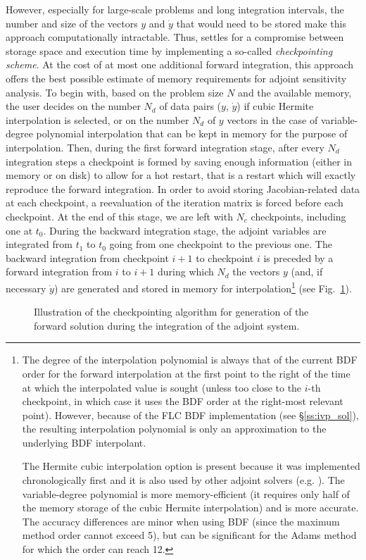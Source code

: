 However, especially for large-scale problems and long integration
intervals, the number and size of the vectors $y$ and ${\dot y}$ that would 
need to be stored make this approach computationally intractable. 
Thus, {\cvodes} settles for a compromise between storage space and execution time by
implementing a so-called {\em checkpointing scheme}. At the cost of at most one
additional forward integration, this approach offers the best possible estimate
of memory requirements for adjoint sensitivity analysis. To begin with, based on
the problem size $N$ and the available memory, the user decides on the number
$N_d$ of data pairs ($y$, ${\dot y}$) if cubic Hermite interpolation is selected, 
or on the number $N_d$ of $y$ vectors in the case of variable-degree polynomial
interpolation that can be kept in memory for the purpose of interpolation. 
Then, during the first forward integration stage, after
every $N_d$ integration steps a checkpoint is formed by saving enough information
(either in memory or on disk) to allow for a hot restart, that is a restart
which will exactly reproduce the forward integration. In order to avoid storing
Jacobian-related data at each checkpoint, a reevaluation of the iteration matrix
is forced before each checkpoint. At the end of this stage, we are left with $N_c$ 
checkpoints, including one at $t_0$.
During the backward integration stage, the adjoint variables are integrated
from $t_1$ to $t_0$ going from one checkpoint to the previous one.
The backward integration from checkpoint $i+1$ to checkpoint $i$ is preceded
by a forward integration from $i$ to $i+1$ during which $N_d$ the vectors 
$y$ (and, if necessary ${\dot y}$) are generated and stored in memory for 
interpolation\footnote{The degree of the 
interpolation polynomial is always that of the current BDF order for the forward
interpolation at the first point to the right of the time at which the interpolated
value is sought (unless too close to the $i$-th checkpoint, in which case it uses
the BDF order at the right-most relevant point). However, because of the FLC BDF
implementation (see \S\ref{ss:ivp_sol}), the resulting interpolation polynomial
is only an approximation to the underlying BDF interpolant.

The Hermite cubic interpolation option is present because it was implemented
chronologically first and it is also used by other adjoint solvers (e.g. {\daspkadjoint}).
The variable-degree polynomial is more memory-efficient (it requires only half of the
memory storage of the cubic Hermite interpolation) and is more accurate. 
The accuracy differences are minor when using BDF (since the maximum method order cannot 
exceed 5), but can be significant for the Adams method for which the order can reach
12.}
(see Fig.~\ref{f:ckpnt}).
%
\begin{figure}
\centerline{}
\caption {Illustration of the checkpointing algorithm for generation of 
  the forward solution during the integration of the adjoint system.}
\label{f:ckpnt}
\end{figure}

